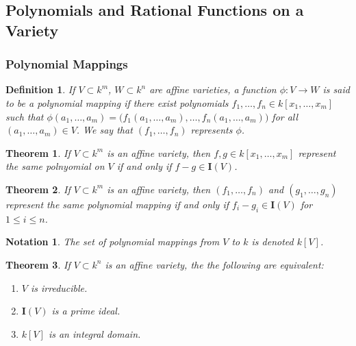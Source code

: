 \documentclass{article}
\theoremstyle{mystyle}
\newtheorem{theorem}{Theorem}[section]
\newtheorem{definition}{Definition}[section]
\newtheorem{notation}{Notation}[section]
\begin{document}
\subsection{Polynomials and Rational Functions on a Variety}
\subsubsection{Polynomial Mappings}
\begin{definition}
If $V\subset k^m$, $W\subset k^n$ are affine varieties, a function $\phi:V\rightarrow W$ is said to be a polynomial mapping if there exist polynomials $f_1,\hdots, f_n\in k[x_1,\hdots, x_m]$ such that $\phi(a_1,\hdots, a_m) = \big(f_1(a_1,\hdots, a_m),\hdots, f_n(a_1,\hdots, a_m)\big)$ for all $(a_1,\hdots, a_m) \in V$. We say that $(f_1,\hdots, f_n)$ represents $\phi$.
\end{definition}
\begin{theorem}
If $V\subset k^m$ is an affine variety, then $f,g\in k[x_1,\hdots, x_m]$ represent the same polnyomial on $V$ if and only if $f-g \in \textbf{I}(V)$.
\end{theorem}
\begin{theorem}
If $V\subset k^m$ is an affine variety, then $(f_1,\hdots, f_n)$ and $(g_1,\hdots, g_n)$ represent the same polynomial mapping if and only if $f_i-g_i \in \textbf{I}(V)$ for $1\leq i \leq n$.
\end{theorem}
\begin{notation}
The set of polynomial mappings from $V$ to $k$ is denoted $k[V]$.
\end{notation}
\begin{theorem}
If $V\subset k^n$ is an affine variety, the the following are equivalent:
\begin{enumerate}
    \item $V$ is irreducible.
    \item $\textbf{I}(V)$ is a prime ideal.
    \item $k[V]$ is an integral domain.
\end{enumerate}
\end{theorem}
\end{document}
